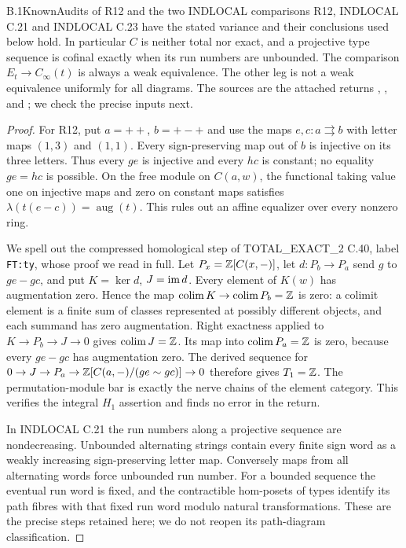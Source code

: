 \begin{claim}{B.1}{Known}{Audits of R12 and the two INDLOCAL comparisons}
\label{B:audits}
R12, INDLOCAL C.21 and INDLOCAL C.23 have the stated variance and
their conclusions used below hold. In particular $C$ is neither
total nor exact, and a projective type sequence is cofinal exactly
when its run numbers are unbounded. The comparison
$E_t\to C_\infty(t)$ is always a weak equivalence. The other leg
is not a weak equivalence uniformly for all diagrams.
The sources are the attached returns
\cite[C.40]{FTOTEX2}, \cite[C.21, C.23]{FINDLOCAL},
and \cite[A.2]{FPATHS}; we check the precise inputs next.
\end{claim}
\begin{proof}
For R12, put $a=++$, $b=+-+$ and use the maps
$e,c:a\rightrightarrows b$ with letter maps $(1,3)$ and $(1,1)$.
Every sign-preserving map out of $b$ is injective on its three
letters. Thus every $ge$ is injective and every $hc$ is constant;
no equality $ge=hc$ is possible. On the free module on $C(a,w)$,
the functional taking value one on injective maps and zero on
constant maps satisfies
$\lambda(t(e-c))=\operatorname{aug}(t)$.
This rules out an affine equalizer over every nonzero ring.

We spell out the compressed homological step of TOTAL\_EXACT\_2
C.40, label \texttt{FT:ty}, whose proof we read in full. Let
$P_x=\mathbb Z[C(x,-)]$, let $d:P_b\to P_a$ send $g$ to $ge-gc$,
and put $K=\ker d$, $J=\operatorname{im} d$. Every element of $K(w)$ has
augmentation zero. Hence the map
$\operatorname*{colim} K\to\operatorname*{colim} P_b=\mathbb Z$ is zero: a colimit element is a
finite sum of classes represented at possibly different objects,
and each summand has zero augmentation. Right exactness applied
to $K\to P_b\to J\to0$ gives $\operatorname*{colim} J=\mathbb Z$. Its map into
$\operatorname*{colim} P_a=\mathbb Z$ is zero, because every $ge-gc$ has augmentation
zero. The derived sequence for
$0\to J\to P_a\to\mathbb Z[C(a,-)/(ge\sim gc)]\to0$
therefore gives $T_1=\mathbb Z$. The permutation-module bar is exactly
the nerve chains of the element category. This verifies the
integral $H_1$ assertion and finds no error in the return.

In INDLOCAL C.21 the run numbers along a projective sequence are
nondecreasing. Unbounded alternating strings contain every finite
sign word as a weakly increasing sign-preserving letter map.
Conversely maps from all alternating words force unbounded run
number. For a bounded sequence the eventual run word is fixed,
and the contractible hom-posets of types identify its path fibres
with that fixed run word modulo natural transformations. These are
the precise steps retained here; we do not reopen its path-diagram
classification.


\end{proof}
